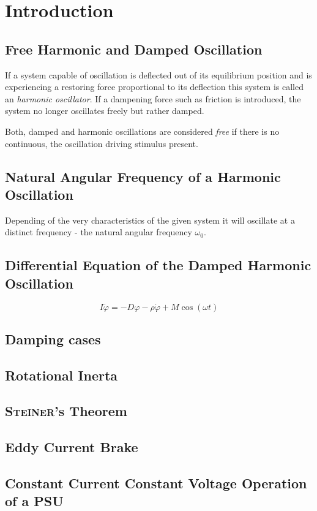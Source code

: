 \chapter{Introduction}
%
\section*{Free Harmonic and Damped Oscillation}
    If a system capable of oscillation is deflected out of its equilibrium position and is experiencing a restoring force
    proportional to its deflection this system is called an \textit{harmonic oscillator}. If a dampening force such as friction
    is introduced, the system no longer oscillates freely but rather damped.\par
    Both, damped and harmonic oscillations are considered \textit{free} if there is no continuous, the oscillation driving
    stimulus present.
\section*{Natural Angular Frequency of a Harmonic Oscillation}
    Depending of the very characteristics of the given system it will oscillate at a distinct frequency - the natural angular
    frequency \( \omega_0 \).
\section*{Differential Equation of the Damped Harmonic Oscillation}
    \begin{equation}
        I \ddot{\varphi} = -D\varphi -\rho\dot{\varphi}+M\cos(\omega t)
    \end{equation}
\section*{Damping cases}
\section*{Rotational Inerta}
\section*{\textsc{Steiner}'s Theorem}
\section*{Eddy Current Brake}
\section*{Constant Current Constant Voltage Operation of a PSU}
